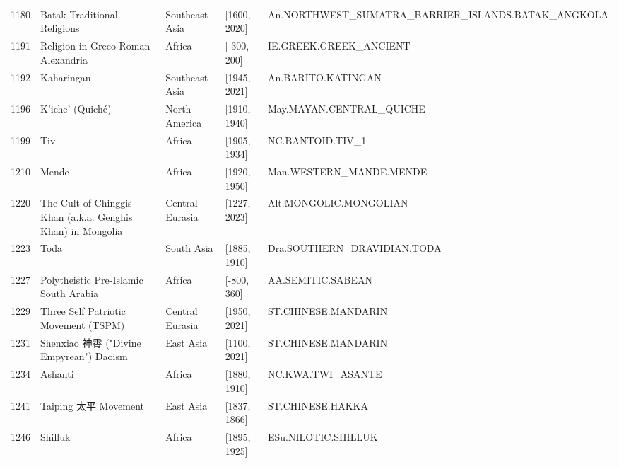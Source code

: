 {\begin{longtable}{rp{3.5cm}llp{3.5cm}}
1180 & {\raggedright Batak Traditional Religions} & Southeast Asia & [1600, 2020] & {\raggedright An.\allowbreak{}NORTHWEST\_\allowbreak{}SUMATRA\_\allowbreak{}BARRIER\_\allowbreak{}ISLANDS.\allowbreak{}BATAK\_\allowbreak{}ANGKOLA} \\
1191 & {\raggedright Religion in Greco-Roman Alexandria} & Africa & [-300, 200] & {\raggedright IE.\allowbreak{}GREEK.\allowbreak{}GREEK\_\allowbreak{}ANCIENT} \\
1192 & {\raggedright Kaharingan} & Southeast Asia & [1945, 2021] & {\raggedright An.\allowbreak{}BARITO.\allowbreak{}KATINGAN} \\
1196 & {\raggedright K’iche’ (Quiché)} & North America & [1910, 1940] & {\raggedright May.\allowbreak{}MAYAN.\allowbreak{}CENTRAL\_\allowbreak{}QUICHE} \\
1199 & {\raggedright Tiv} & Africa & [1905, 1934] & {\raggedright NC.\allowbreak{}BANTOID.\allowbreak{}TIV\_\allowbreak{}1} \\
1210 & {\raggedright Mende} & Africa & [1920, 1950] & {\raggedright Man.\allowbreak{}WESTERN\_\allowbreak{}MANDE.\allowbreak{}MENDE} \\
1220 & {\raggedright The Cult of Chinggis Khan (a.k.a. Genghis Khan) in Mongolia} & Central Eurasia & [1227, 2023] & {\raggedright Alt.\allowbreak{}MONGOLIC.\allowbreak{}MONGOLIAN} \\
1223 & {\raggedright Toda} & South Asia & [1885, 1910] & {\raggedright Dra.\allowbreak{}SOUTHERN\_\allowbreak{}DRAVIDIAN.\allowbreak{}TODA} \\
1227 & {\raggedright Polytheistic Pre-Islamic South Arabia} & Africa & [-800, 360] & {\raggedright AA.\allowbreak{}SEMITIC.\allowbreak{}SABEAN} \\
1229 & {\raggedright Three Self Patriotic Movement (TSPM)} & Central Eurasia & [1950, 2021] & {\raggedright ST.\allowbreak{}CHINESE.\allowbreak{}MANDARIN} \\
1231 & {\raggedright Shenxiao 神霄 ("Divine Empyrean") Daoism} & East Asia & [1100, 2021] & {\raggedright ST.\allowbreak{}CHINESE.\allowbreak{}MANDARIN} \\
1234 & {\raggedright Ashanti} & Africa & [1880, 1910] & {\raggedright NC.\allowbreak{}KWA.\allowbreak{}TWI\_\allowbreak{}ASANTE} \\
1241 & {\raggedright Taiping 太平 Movement} & East Asia & [1837, 1866] & {\raggedright ST.\allowbreak{}CHINESE.\allowbreak{}HAKKA} \\
1246 & {\raggedright Shilluk} & Africa & [1895, 1925] & {\raggedright ESu.\allowbreak{}NILOTIC.\allowbreak{}SHILLUK} \\

\end{longtable}}
